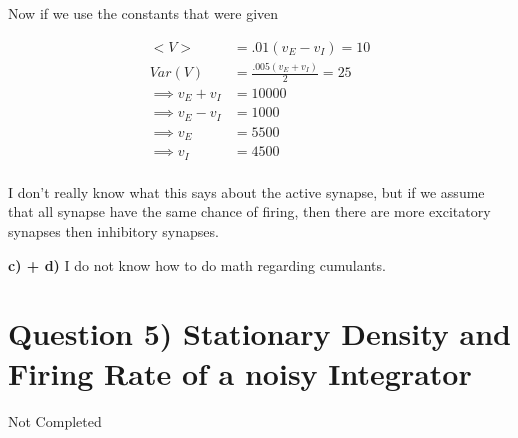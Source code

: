 \documentclass{article}
\begin{document}
Now if we use the constants that were given

\begin{align}
    <V> &= .01(v_E-v_I) = 10\\
    Var(V) &= \frac{.005(v_E+v_I)}{2} = 25\\
    \implies v_E+v_I &= 10000\\
    \implies v_E-v_I &= 1000\\
    \implies v_E &= 5500\\
    \implies v_I &= 4500\\
\end{align}

I don't really know what this says about the active synapse, but if we assume that all synapse
have the same chance of firing, then there are more excitatory synapses then inhibitory synapses.

\textbf{c) + d)} I do not know how to do math regarding cumulants.

\section{Question 5) Stationary Density and Firing Rate of a noisy Integrator}

Not Completed
\end{document}
